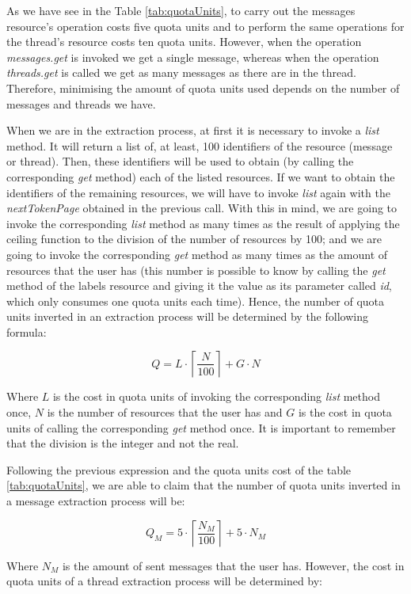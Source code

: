 As we have see in the Table \ref{tab:quotaUnits}, to carry out the messages resource's operation costs five quota units and to perform the same operations for the thread's resource costs ten quota units. However, when the operation \textit{messages.get} is invoked we get a single message, whereas when the operation \textit{threads.get} is called we get as many messages as there are in the thread. Therefore, minimising the amount of quota units used depends on the number of messages and threads we have.

When we are in the extraction process, at first it is necessary to invoke a \textit{list} method. It will return a list of, at least, 100 identifiers of the resource (message or thread). Then, these identifiers will be used to obtain (by calling the corresponding \textit{get} method) each of the listed resources. If we want to obtain the identifiers of the remaining resources, we will have to invoke \textit{list} again with the \textit{nextTokenPage} obtained in the previous call. With this in mind, we are going to invoke the corresponding \textit{list} method as many times as the result of applying the ceiling function to the division of the number of resources by 100; and we are going to invoke the corresponding \textit{get} method as many times as the amount of resources that the user has (this number is possible to know by calling the \textit{get} method of the labels resource and giving it the value  as its parameter called \textit{id}, which only consumes one quota units each time). Hence, the number of quota units inverted in an extraction process will be determined by the following formula:

$$
Q = L\cdot\left\lceil\frac{N}{100}\right\rceil+G\cdot N
$$

Where $L$ is the cost in quota units of invoking the corresponding \textit{list} method once, $N$ is the number of resources that the user has and $G$ is the cost in quota units of calling the corresponding \textit{get} method once. It is important to remember that the division is the integer and not the real.

Following the previous expression and the quota units cost of the table \ref{tab:quotaUnits}, we are able to claim that the number of quota units inverted in a message extraction process will be:

$$
Q_M = 5\cdot\left\lceil\frac{N_M}{100}\right\rceil+5\cdot N_M
$$

Where $N_M$ is the amount of sent messages that the user has. However, the cost in quota units of a thread extraction process will be determined by:

